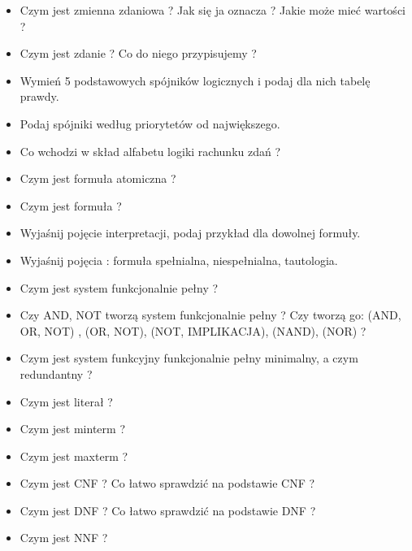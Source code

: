 \documentclass[a4paper,15pt]{article}
\begin{document}


\begin{itemize}
\item Czym jest zmienna zdaniowa ? Jak się ja oznacza ? Jakie może mieć wartości ?

\item Czym jest zdanie ? Co do niego przypisujemy ? 

\item Wymień 5 podstawowych spójników logicznych i podaj dla nich tabelę prawdy.

\item Podaj spójniki według priorytetów od największego.

\item Co wchodzi w skład alfabetu logiki rachunku zdań ?

\item Czym jest formuła atomiczna ?

\item Czym jest formuła ?

\item Wyjaśnij pojęcie interpretacji, podaj przykład dla dowolnej formuły.

\item Wyjaśnij pojęcia : formuła spełnialna, niespełnialna, tautologia. 

\item Czym jest system funkcjonalnie pełny ? 

\item Czy AND, NOT tworzą system funkcjonalnie pełny ? Czy tworzą go: (AND, OR, NOT) , (OR, NOT), (NOT, IMPLIKACJA), (NAND), (NOR) ? 

\item Czym jest system funkcyjny funkcjonalnie pełny minimalny, a czym redundantny ?

\item Czym jest literał ?

\item Czym jest minterm ?

\item Czym jest maxterm ?

\item Czym jest CNF ? Co łatwo sprawdzić na podstawie CNF ?

\item Czym jest DNF ? Co łatwo sprawdzić na podstawie DNF ?

\item Czym jest NNF ?


\end{itemize}
\end{document}

